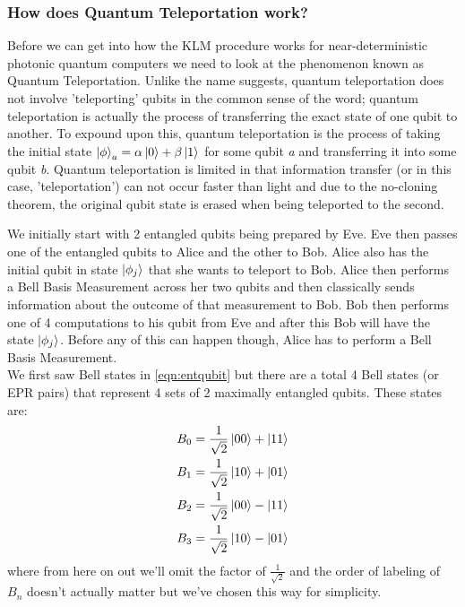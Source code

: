 \subsubsection{How does Quantum Teleportation work?}
Before we can get into how the KLM procedure works for near-deterministic photonic quantum computers we need to look at the phenomenon known as Quantum Teleportation. Unlike the name suggests, quantum teleportation does not involve 'teleporting' qubits in the common sense of the word; quantum teleportation is actually the process of transferring the exact state of one qubit to another. To expound upon this, quantum teleportation is the process of taking the initial state $\ket{\phi}_a = \alpha\ket{0} + \beta\ket{1}$ for some qubit \textit{a} and transferring it into some qubit \textit{b}. Quantum teleportation is limited in that information transfer (or in this case, 'teleportation') can not occur faster than light and due to the no-cloning theorem, the original qubit state is erased when being teleported to the second.
\par
We initially start with 2 entangled qubits being prepared by Eve. Eve then passes one of the entangled qubits to Alice and the other to Bob. Alice also has the initial qubit in state $\ket{\phi_j}$ that she wants to teleport to Bob. Alice then performs a Bell Basis Measurement across her two qubits and then classically sends information about the outcome of that measurement to Bob. Bob then performs one of 4 computations to his qubit from Eve and after this Bob will have the state $\ket{\phi_j}$. Before any of this can happen though, Alice has to perform a Bell Basis Measurement. \\
We first saw Bell states in  \ref{eqn:entqubit} but there are a total 4 Bell states (or EPR pairs) that represent 4 sets of 2 maximally entangled qubits. These states are:
\begin{align}\label{eqn:Bell States}
    B_0 &= \frac{1}{\sqrt{2}}\ket{00} + \ket{11} \\
    B_1 &= \frac{1}{\sqrt{2}}\ket{10} + \ket{01} \\
    B_2 &= \frac{1}{\sqrt{2}}\ket{00} - \ket{11} \\
    B_3 &= \frac{1}{\sqrt{2}}\ket{10} - \ket{01} \\
\end{align}
where from here on out we'll omit the factor of $\frac{1}{\sqrt{2}}$ and the order of labeling of $B_n$ doesn't actually matter but we've chosen this way for simplicity. 
\par
